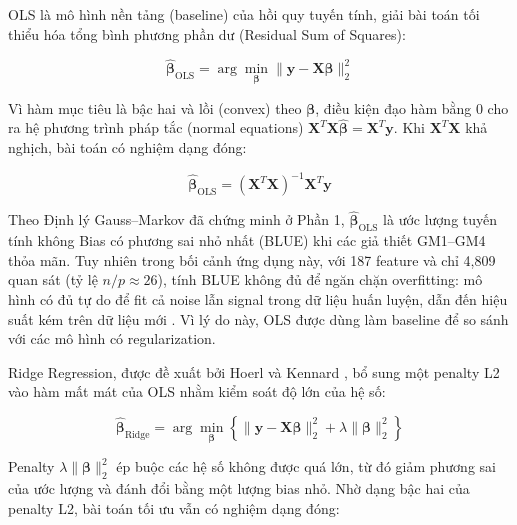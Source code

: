 
OLS là mô hình nền tảng (baseline) của hồi quy tuyến tính, giải bài toán tối thiểu hóa tổng bình phương phần dư (Residual Sum of Squares):

\begin{equation}
    \hat{\boldsymbol{\beta}}_{\text{OLS}} = \arg\min_{\boldsymbol{\beta}} \|\mathbf{y} - \mathbf{X}\boldsymbol{\beta}\|_2^2
\end{equation}

Vì hàm mục tiêu là bậc hai và lồi (convex) theo $\boldsymbol{\beta}$, điều kiện đạo hàm bằng 0 cho ra hệ phương trình pháp tắc (normal equations) $\mathbf{X}^T\mathbf{X}\hat{\boldsymbol{\beta}} = \mathbf{X}^T\mathbf{y}$. Khi $\mathbf{X}^T\mathbf{X}$ khả nghịch, bài toán có nghiệm dạng đóng:

\begin{equation}
    \hat{\boldsymbol{\beta}}_{\text{OLS}} = (\mathbf{X}^T\mathbf{X})^{-1}\mathbf{X}^T\mathbf{y}
\end{equation}

Theo Định lý Gauss–Markov đã chứng minh ở Phần 1, $\hat{\boldsymbol{\beta}}_{\text{OLS}}$ là ước lượng tuyến tính không Bias có phương sai nhỏ nhất (BLUE) khi các giả thiết GM1–GM4 thỏa mãn. Tuy nhiên trong bối cảnh ứng dụng này, với 187 feature và chỉ 4{,}809 quan sát (tỷ lệ $n/p \approx 26$), tính BLUE không đủ để ngăn chặn overfitting: mô hình có đủ tự do để fit cả noise lẫn signal trong dữ liệu huấn luyện, dẫn đến hiệu suất kém trên dữ liệu mới \cite{james2013}. Vì lý do này, OLS được dùng làm baseline để so sánh với các mô hình có regularization.


Ridge Regression, được đề xuất bởi Hoerl và Kennard \cite{hoerl1970}, bổ sung một penalty L2 vào hàm mất mát của OLS nhằm kiểm soát độ lớn của hệ số:

\begin{equation}
    \hat{\boldsymbol{\beta}}_{\text{Ridge}} = \arg\min_{\boldsymbol{\beta}} \left\{ \|\mathbf{y} - \mathbf{X}\boldsymbol{\beta}\|_2^2 + \lambda\|\boldsymbol{\beta}\|_2^2 \right\}
\end{equation}

Penalty $\lambda\|\boldsymbol{\beta}\|_2^2$ ép buộc các hệ số không được quá lớn, từ đó giảm phương sai của ước lượng và đánh đổi bằng một lượng bias nhỏ. Nhờ dạng bậc hai của penalty L2, bài toán tối ưu vẫn có nghiệm dạng đóng:


